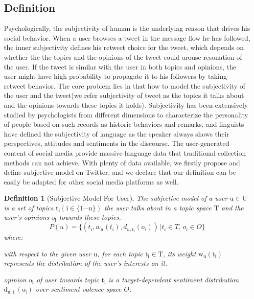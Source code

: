 \documentclass[preprint]{elsarticle}
\newtheorem{definition}{Definition}
\begin{document}
\subsection{Definition}
\label{definition}
Psychologically, the subjectivity of human is the underlying reason that drives his social behavior.
When a user browses a tweet in the message flow he has followed, the inner subjectivity defines his retweet choice for the tweet, which depends on whether the the topics and the opinions of the tweet could arouse resonation of the user.
If the tweet is similar with the user in both topics and opinions, the user might have high probability to propagate it to his followers by taking retweet behavior. 
The core problem lies in that how to model the subjectivity of the user and the tweet(we refer subjectivity of tweet as the topics it talks about and the opinions towards these topics it holds). 
Subjectivity has been extensively studied by psychologists from different dimensions to characterize the personality of people based on such records as historic behaviors and remarks\cite{Engbert2007}, and linguists have defined the subjectivity of language as the speaker always shows their perspectives, attitudes and sentiments in the discourse\cite{stein2005subjectivity}. 
The user-generated content of social media provide massive language data that traditional collection methods can not achieve.
With plenty of data available, we firstly propose and define subjective model on Twitter, and we declare that our definition can be easily be adapted for other social media platforms as well.
\begin{definition}[Subjective Model For User]
The subjective model of a user $\mathrm{u \in U}$ is a set of topics $\mathrm{t_{i} \left( i \in \lbrace1 \cdots n \rbrace \right) }$ 
the user talks about in a topic space $\mathrm{T}$ and the user's opinions $\mathrm{o_{i}}$ towards these topics.
\begin{equation}
\label{usermodel}
P \left( u \right) = \lbrace \left( t_{i}, w_{u} \left( t_{i} \right), d_{u,t_{i}} \left( o_{i} \right) \right) \,\vert  t_{i} \in T, \, o_{i} \in O \rbrace
\end{equation}
where:
\begin{itemize*}
\item with respect to the given user $\mathrm{u}$,  for each topic $\mathrm{t_{i} \in T}$, its  weight $\mathrm{ w_{u} \left( t_{i} \right)}$ represents the distribution of the user's interests on it.
\item opinion $\mathrm{o_{i}}$ of user towards topic $\mathrm{t_{i}}$ is a target-dependent sentiment distribution  $\mathrm{d_{u,t_{i}} \left( o_{i} \right)}$ over sentiment valence space $O$.
\end{itemize*}
\end{definition}
\end{document}
